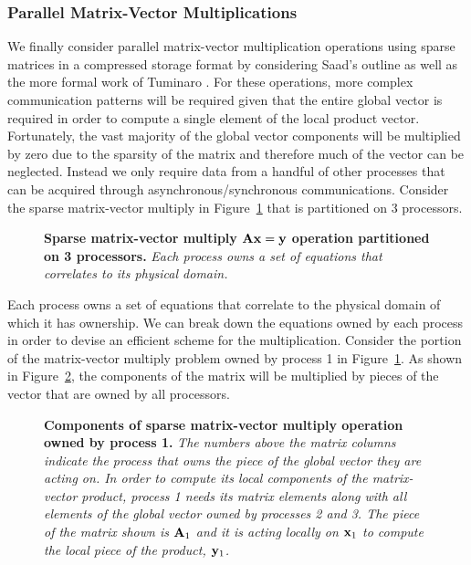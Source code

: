 \subsubsection{Parallel Matrix-Vector Multiplications}
\label{subsubsec:parallel_mat_vec_mutliply}
We finally consider parallel matrix-vector multiplication operations
using sparse matrices in a compressed storage format by considering
Saad's outline as well as the more formal work of Tuminaro
\citep{tuminaro_parallel_1998}. For these operations, more complex
communication patterns will be required given that the entire global
vector is required in order to compute a single element of the local
product vector. Fortunately, the vast majority of the global vector
components will be multiplied by zero due to the sparsity of the
matrix and therefore much of the vector can be neglected. Instead we
only require data from a handful of other processes that can be
acquired through asynchronous/synchronous communications. Consider the
sparse matrix-vector multiply in
Figure~\ref{fig:partitioned_matvec_multiply} that is partitioned on 3
processors.
\begin{figure}[htpb!]
  \begin{center}
    \scalebox{1.5}{
       }
  \end{center}
  \caption{\textbf{Sparse matrix-vector multiply $\mathbf{A}\mathbf{x}=\mathbf{y}$
      operation partitioned on 3 processors.} \textit{Each process
      owns a set of equations that correlates to its physical
      domain.}}
  \label{fig:partitioned_matvec_multiply}
\end{figure}
Each process owns a set of equations that correlate to the physical
domain of which it has ownership. We can break down the equations
owned by each process in order to devise an efficient scheme for the
multiplication. Consider the portion of the matrix-vector multiply
problem owned by process 1 in
Figure~\ref{fig:partitioned_matvec_multiply}. As shown in
Figure~\ref{fig:matvec_proc_1}, the components of the matrix will be
multiplied by pieces of the vector that are owned by all
processors. 
\begin{figure}[htpb!]
  \begin{center}
    \scalebox{1.5}{
       }
  \end{center}
  \caption{\textbf{Components of sparse matrix-vector multiply
      operation owned by process 1.} \textit{The numbers above the
      matrix columns indicate the process that owns the piece of the
      global vector they are acting on. In order to compute its local
      components of the matrix-vector product, process 1 needs its
      matrix elements along with all elements of the global vector
      owned by processes 2 and 3. The piece of the matrix shown is
      $\mathbf{A}_1$ and it is acting locally on $\mathbf{x}_1$ to compute the
      local piece of the product, $\mathbf{y}_1$.}}
  \label{fig:matvec_proc_1}
\end{figure}
